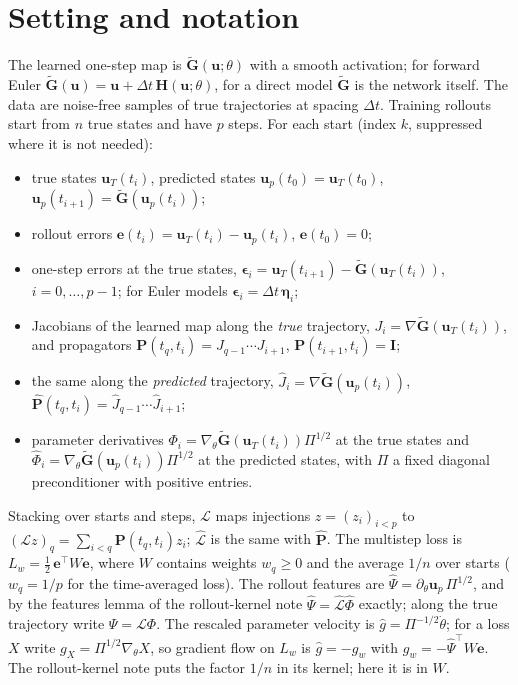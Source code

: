 \documentclass[11pt]{article}
\theoremstyle{definition}
\theoremstyle{remark}
\newcommand{\uu}{\mathbf{u}}
\newcommand{\ee}{\mathbf{e}}
\newcommand{\Gt}{\tilde{\mathbf{G}}}
\newcommand{\I}{\mathbf{I}}
\newcommand{\Hop}{\mathbf{H}}
\newcommand{\eps}{\bm{\epsilon}}
\newcommand{\dt}{\Delta t}
\newcommand{\LL}{\mathcal{L}}
\newcommand{\Pp}{\mathbf P}
\newcommand{\Ph}{\hat{\mathbf P}}
\newcommand{\LLh}{\hat{\mathcal{L}}}
\newcommand{\Phih}{\hat\Phi}
\newcommand{\Psih}{\hat\Psi}
\newcommand{\etab}{\bm{\eta}}
\begin{document}
\section{Setting and notation}\label{sec:setting}

The learned one-step map is $\Gt(\uu;\theta)$ with a smooth activation; for forward Euler $\Gt(\uu)=\uu+\dt\,\Hop(\uu;\theta)$, for a direct model $\Gt$ is the network itself.
The data are noise-free samples of true trajectories at spacing $\dt$.
Training rollouts start from $n$ true states and have $p$ steps.
For each start (index $k$, suppressed where it is not needed):
\begin{itemize}
\item true states $\uu_T(t_i)$, predicted states $\uu_p(t_0)=\uu_T(t_0)$, $\uu_p(t_{i+1})=\Gt(\uu_p(t_i))$;
\item rollout errors $\ee(t_i)=\uu_T(t_i)-\uu_p(t_i)$, $\ee(t_0)=0$;
\item one-step errors at the true states, $\eps_i=\uu_T(t_{i+1})-\Gt(\uu_T(t_i))$, $i=0,\dots,p-1$; for Euler models $\eps_i=\dt\,\etab_i$;
\item Jacobians of the learned map along the \emph{true} trajectory, $J_i=\nabla\Gt(\uu_T(t_i))$, and propagators $\Pp(t_q,t_i)=J_{q-1}\cdots J_{i+1}$, $\Pp(t_{i+1},t_i)=\I$;
\item the same along the \emph{predicted} trajectory, $\hat J_i=\nabla\Gt(\uu_p(t_i))$, $\Ph(t_q,t_i)=\hat J_{q-1}\cdots\hat J_{i+1}$;
\item parameter derivatives $\Phi_i=\nabla_\theta\Gt(\uu_T(t_i))\Pi^{1/2}$ at the true states and $\Phih_i=\nabla_\theta\Gt(\uu_p(t_i))\Pi^{1/2}$ at the predicted states, with $\Pi$ a fixed diagonal preconditioner with positive entries.
\end{itemize}
Stacking over starts and steps, $\LL$ maps injections $z=(z_i)_{i<p}$ to $(\LL z)_q=\sum_{i<q}\Pp(t_q,t_i)z_i$; $\LLh$ is the same with $\Ph$.
The multistep loss is $L_w=\tfrac12\,\ee^\top W\ee$, where $W$ contains weights $w_q\ge0$ and the average $1/n$ over starts ($w_q=1/p$ for the time-averaged loss).
The rollout features are $\Psih=\partial_\theta\uu_p\,\Pi^{1/2}$, and by the features lemma of the rollout-kernel note $\Psih=\LLh\Phih$ exactly; along the true trajectory write $\Psi=\LL\Phi$.
The rescaled parameter velocity is $\hat g=\Pi^{-1/2}\dot\theta$; for a loss $X$ write $g_X=\Pi^{1/2}\nabla_\theta X$, so gradient flow on $L_w$ is $\hat g=-g_w$ with $g_w=-\Psih^\top W\ee$.
The rollout-kernel note puts the factor $1/n$ in its kernel; here it is in $W$.
\end{document}
